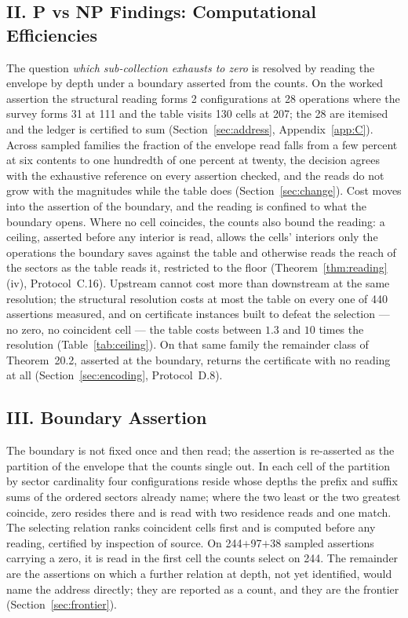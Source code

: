 \documentclass[pdflatex,sn-mathphys-num]{sn-jnl}
\theoremstyle{thmstyleone}%
\theoremstyle{thmstyletwo}%
\theoremstyle{thmstylethree}%
\newcommand{\selFirst}{244}\newcommand{\selSecond}{97}\newcommand{\selLater}{38}\newcommand{\selNone}{21}\newcommand{\selTotal}{400}
\newcommand{\workedSurveyOps}{111}
\newcommand{\workedSurveyFormed}{31}
\newcommand{\workedTableOps}{207}
\newcommand{\workedTableFormed}{130}
\newcommand{\workedStructOps}{28}
\newcommand{\workedStructFormed}{2}
\begin{document}
\subsection*{II. P vs NP Findings: Computational Efficiencies}
The question \emph{which sub-collection exhausts to zero} is resolved by reading the envelope by depth under a boundary asserted from the counts. On the worked assertion the structural reading forms \workedStructFormed{} configurations at \workedStructOps{} operations where the survey forms \workedSurveyFormed{} at \workedSurveyOps{} and the table visits \workedTableFormed{} cells at \workedTableOps{}; the \workedStructOps{} are itemised and the ledger is certified to sum (Section~\ref{sec:address}, Appendix~\ref{app:C}). Across sampled families the fraction of the envelope read falls from a few percent at six contents to one hundredth of one percent at twenty, the decision agrees with the exhaustive reference on every assertion checked, and the reads do not grow with the magnitudes while the table does (Section~\ref{sec:change}). Cost moves into the assertion of the boundary, and the reading is confined to what the boundary opens. Where no cell coincides, the counts also bound the reading: a ceiling, asserted before any interior is read, allows the cells' interiors only the operations the boundary saves against the table and otherwise reads the reach of the sectors as the table reads it, restricted to the floor (Theorem~\ref{thm:reading}(iv), Protocol~C.16). Upstream cannot cost more than downstream at the same resolution; the structural resolution costs at most the table on every one of 440 assertions measured, and on certificate instances built to defeat the selection --- no zero, no coincident cell --- the table costs between $1.3$ and $10$ times the resolution (Table~\ref{tab:ceiling}). On that same family the remainder class of Theorem~20.2, asserted at the boundary, returns the certificate with no reading at all (Section~\ref{sec:encoding}, Protocol~D.8).

\subsection*{III. Boundary Assertion}
The boundary is not fixed once and then read; the assertion is re-asserted as the partition of the envelope that the counts single out. In each cell of the partition by sector cardinality four configurations reside whose depths the prefix and suffix sums of the ordered sectors already name; where the two least or the two greatest coincide, zero resides there and is read with two residence reads and one match. The selecting relation ranks coincident cells first and is computed before any reading, certified by inspection of source. On \selFirst{}$+$\selSecond{}$+$\selLater{} sampled assertions carrying a zero, it is read in the first cell the counts select on \selFirst{}. The remainder are the assertions on which a further relation at depth, not yet identified, would name the address directly; they are reported as a count, and they are the frontier (Section~\ref{sec:frontier}).
\end{document}
